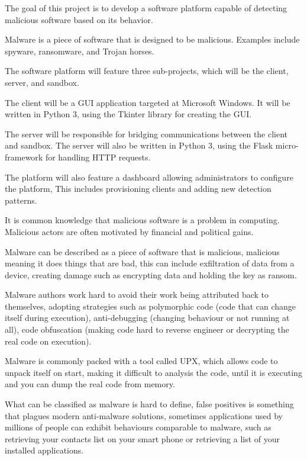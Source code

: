 
The goal of this project is to develop a software platform capable of detecting malicious software based on its behavior.

Malware is a piece of software that is designed to be malicious.
Examples include spyware, ransomware, and Trojan horses.

The software platform will feature three sub-projects, which will be the client, server, and sandbox.

The client will be a GUI application targeted at Microsoft Windows.
It will be written in Python 3, using the Tkinter library for creating the GUI.

The server will be responsible for bridging communications between the client and sandbox.
The server will also be written in Python 3, using the Flask micro-framework for handling HTTP requests.

The platform will also feature a dashboard allowing administrators to configure the platform,
This includes provisioning clients and adding new detection patterns.


It is common knowledge that malicious software is a problem in computing.
Malicious actors are often motivated by financial and political gains.

Malware can be described as a piece of software that is malicious,
malicious meaning it does things that are bad,
this can include exfiltration of data from a device,
creating damage such as encrypting data and holding the key as ransom.

Malware authors work hard to avoid their work being attributed back to themselves,
adopting strategies such as polymorphic code (code that can change itself during execution),
anti-debugging (changing behaviour or not running at all),
code obfuscation (making code hard to reverse engineer or decrypting the real code on execution).

Malware is commonly packed with a tool called UPX, which allows code to unpack itself on start,
making it difficult to analysis the code, until it is executing and you can dump the real code from memory.

What can be classified as malware is hard to define, false positives is something that plagues modern anti-malware solutions,
sometimes applications used by millions of people can exhibit behaviours comparable to malware,
such as retrieving your contacts list on your smart phone or retrieving a list of your installed applications.

